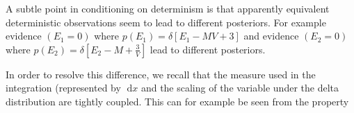 \documentclass{article}
\newcommand{\pr}{p}
\newcommand{\dd}{\;\mathrm{d}} %
\begin{document}
A subtle point in conditioning on determinism is that apparently equivalent deterministic observations seem
to lead to different posteriors. For example evidence $(E_1 = 0)$ where $\pr(E_1)= \delta[E_1 - M V + 3]$ and 
evidence $(E_2 = 0)$ where $\pr(E_2) = \delta[E_2 - M + \frac{3}{V}]$ lead to different posteriors.

In order to resolve this difference, we recall that the measure used in the integration (represented by $ \dd x $
and the scaling of the variable under the delta distribution are tightly coupled. This can for example be seen from
the property



\end{document}
